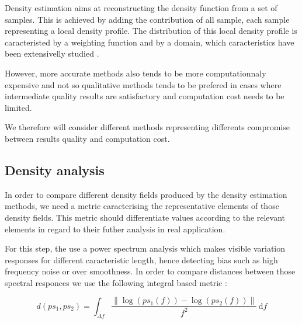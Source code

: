 \documentclass[10pt,a4paper,twoside,twocolumn]{article}
\newcommand*{\rootPath}{../}
\begin{document}
Density estimation aims at reconstructing the density function from a set of
samples. This is achieved by adding the contribution of all sample, each sample
representing a local density profile. The distribution of this local density
profile is caracteristed by a weighting function and by a domain, which
caracteristics have been extensivelly studied
.

However, more accurate methods also tends to be more computationnaly expensive
and not so qualitative methods tends to be prefered in cases where intermediate
quality results are satisfactory and computation cost needs to be limited.

We therefore will consider different methods representing differents compromise
between results quality and computation cost.

\subsection{Density analysis}

In order to compare different density fields produced by the density estimation
methods, we need a metric caracterising the representative elements of those
density fields. This metric should differentiate values according to the
relevant elements in regard to their futher analysis in real application.

For this step, the use a power spectrum analysis which makes visible variation
responses for different caracteristic length, hence detecting bias such as high
frequency noise or over smoothness. In order to compare distances between those
spectral responces we use the following integral based metric :

\begin{equation}
	d(ps_1, ps_2) = \int_{\Delta f}\frac{\|\log(ps_1(f))-\log(ps_2(f))\|}{f^2}\, \mathrm df
	\label{eq:psd_metric}
\end{equation}


\ifstandalone
	
	
\fi
\end{document}
